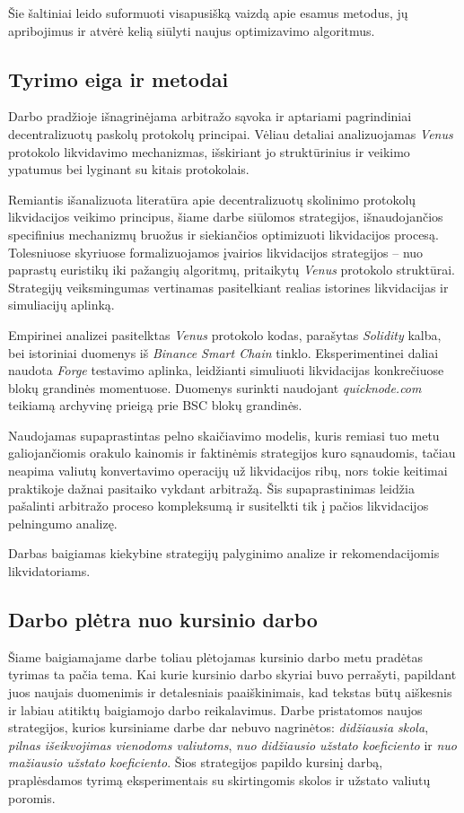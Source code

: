 \documentclass[]{VUMIFTemplateClass}
\begin{document}
Šie šaltiniai leido suformuoti visapusišką vaizdą apie esamus metodus, jų apribojimus ir atvėrė kelią siūlyti naujus optimizavimo algoritmus.

\subsection*{Tyrimo eiga ir metodai}
Darbo pradžioje išnagrinėjama arbitražo sąvoka ir aptariami pagrindiniai decentralizuotų paskolų protokolų principai. Vėliau detaliai analizuojamas \textit{Venus} protokolo likvidavimo mechanizmas, išskiriant jo struktūrinius ir veikimo ypatumus bei lyginant su kitais protokolais.

Remiantis išanalizuota literatūra apie decentralizuotų skolinimo protokolų likvidacijos veikimo principus, šiame darbe siūlomos strategijos, išnaudojančios specifinius mechanizmų bruožus ir siekiančios optimizuoti likvidacijos procesą. Tolesniuose skyriuose formalizuojamos įvairios likvidacijos strategijos – nuo paprastų euristikų iki pažangių algoritmų, pritaikytų \textit{Venus} protokolo struktūrai. Strategijų veiksmingumas vertinamas pasitelkiant realias istorines likvidacijas ir simuliacijų aplinką.

Empirinei analizei pasitelktas \textit{Venus} protokolo kodas, parašytas \textit{Solidity} kalba, bei istoriniai duomenys iš \textit{Binance Smart Chain} tinklo. Eksperimentinei daliai naudota \textit{Forge} \cite{forge} testavimo aplinka, leidžianti simuliuoti likvidacijas konkrečiuose blokų grandinės momentuose. Duomenys surinkti naudojant \textit{quicknode.com} teikiamą archyvinę prieigą prie BSC blokų grandinės.

Naudojamas supaprastintas pelno skaičiavimo modelis, kuris remiasi tuo metu galiojančiomis orakulo kainomis ir faktinėmis strategijos kuro sąnaudomis, tačiau neapima valiutų konvertavimo operacijų už likvidacijos ribų, nors tokie keitimai praktikoje dažnai pasitaiko vykdant arbitražą. Šis supaprastinimas leidžia pašalinti arbitražo proceso kompleksumą ir susitelkti tik į pačios likvidacijos pelningumo analizę.

Darbas baigiamas kiekybine strategijų palyginimo analize ir rekomendacijomis likvidatoriams.

\subsection*{Darbo plėtra nuo kursinio darbo}
Šiame baigiamajame darbe toliau plėtojamas kursinio darbo metu pradėtas tyrimas ta pačia tema. Kai kurie kursinio darbo skyriai buvo perrašyti, papildant juos naujais duomenimis ir detalesniais paaiškinimais, kad tekstas būtų aiškesnis ir labiau atitiktų baigiamojo darbo reikalavimus. Darbe pristatomos naujos strategijos, kurios kursiniame darbe dar nebuvo nagrinėtos: \textit{didžiausia skola}, \textit{pilnas išeikvojimas vienodoms valiutoms}, \textit{nuo didžiausio užstato koeficiento} ir \textit{nuo mažiausio užstato koeficiento}. Šios strategijos papildo kursinį darbą, praplėsdamos tyrimą eksperimentais su skirtingomis skolos ir užstato valiutų poromis.
\end{document}
